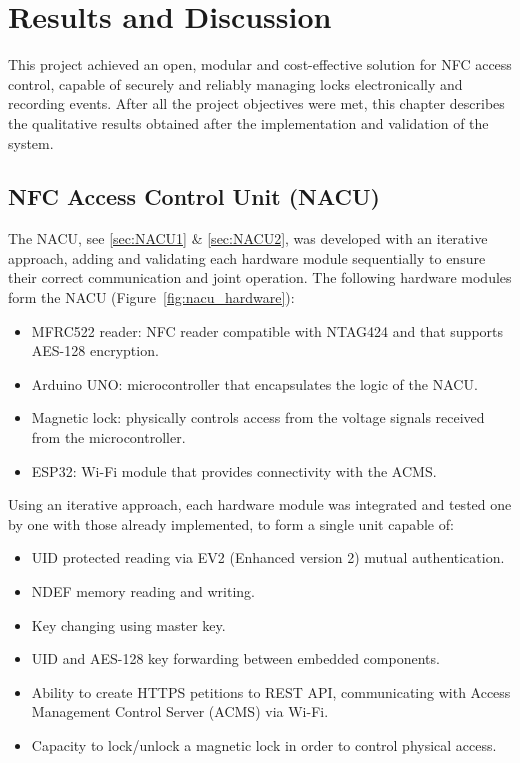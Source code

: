 \chapter{Results and Discussion}
\label{chap:results}

This project achieved an open, modular and cost-effective solution for NFC access control, capable of securely and reliably managing locks electronically and recording events. After all the project objectives were met, this chapter describes the qualitative results obtained after the implementation and validation of the system.

\section{NFC Access Control Unit (NACU)}
\label{sec:nacu}

The NACU, see \ref{sec:NACU1} \& \ref{sec:NACU2}, was developed with an iterative approach, adding and validating each hardware module sequentially to ensure their correct communication and joint operation. The following hardware modules form the NACU (Figure~\ref{fig:nacu_hardware}): 
\begin{itemize}
	\item MFRC522 reader: NFC reader compatible with NTAG424 and that supports AES-128 encryption.
	\item Arduino UNO: microcontroller that encapsulates the logic of the NACU.
	\item Magnetic lock: physically controls access from the voltage signals received from the microcontroller.
	\item ESP32: Wi-Fi module that provides connectivity with the ACMS.
\end{itemize}

Using an iterative approach, each hardware module was integrated and tested one by one with those already implemented, to form a single unit capable of:
\begin{itemize}
	\item UID protected reading via EV2 (Enhanced version 2) mutual authentication.
	\item NDEF memory reading and writing.
	\item Key changing using master key.
	\item UID and AES-128 key forwarding between embedded components.
	\item Ability to create HTTPS petitions to REST API, communicating with Access Management Control Server (ACMS) via Wi-Fi.
	\item Capacity to lock/unlock a magnetic lock in order to control physical access.
\end{itemize}

